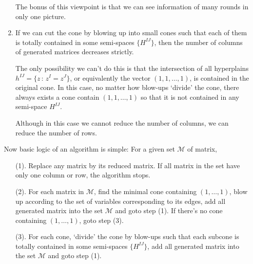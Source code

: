 \documentclass[12pt]{article}
\theoremstyle{definition}
\theoremstyle{plain}
\begin{document}
\begin{enumerate}
	The bonus of this viewpoint is that we can see information of many rounds 
	in only one picture.

	\item If we can cut the cone by blowing up into small cones such that 
	each of them is totally contained in some semi-spaces $\{H^{IJ}\}$, then
	the number of columns of generated matrices decreases strictly.

	The only possibility we can't do this is that 
	the intersection of all hyperplains $h^{IJ}=\{z\,:\, z^I=z^J\}$, 
	or equivalently the vector $(1,1,\dots,1)$, 
	is contained in the original cone.
	In this case, no matter how blow-ups `divide' the cone, 
	there always exists a cone contain
	$(1,1,\dots,1)$ so that it is not contained in any semi-space $H^{IJ}$.

	Although in this case we cannot reduce the number of columns, we can reduce the number of rows.
\end{enumerate}
Now basic logic of an algorithm is simple: For a given set $\mathcal M$ of matrix,
\begin{enumerate}
	\item[(1).] Replace any matrix by its reduced matrix. If all matrix in the set
	have only one column or row, the algorithm stops.
	\item[(2).] For each matrix in $\mathcal M$, 
		find the minimal cone containing $(1,\dots,1)$, blow up according to
		the set of variables corresponding to its edges, 
		add all generated matrix into the set $\mathcal M$ and goto step (1).
		If there's no cone containing $(1,\dots,1)$, goto step (3).
	\item[(3).] For each cone, `divide' the cone by blow-ups such that 
		each subcone is totally contained in some semi-spaces 
		$\{H^{IJ}\}$, 
		add all generated matrix into the set $\mathcal M$ and goto step (1).
\end{enumerate}
\end{document}
